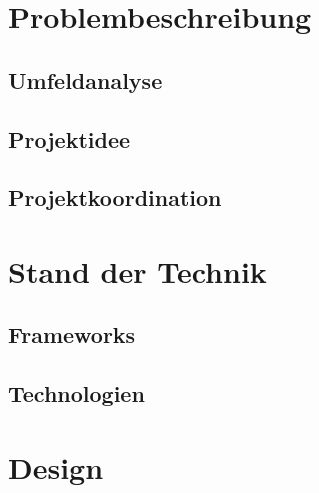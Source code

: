 \documentclass[12pt]{article}
\begin{document}
\section{Problembeschreibung}
\label{sec:problembeschreibung}


\subsection{Umfeldanalyse}
\label{subsec:umfeldanalyse}


\newpage

\subsection{Projektidee}
\label{subsec:projektidee}


\subsection{Projektkoordination}
\label{subsec:projektkoordination}


\newpage

\section{Stand der Technik}
\label{sec:standdertechnik}


\subsection{Frameworks}
\label{subsec:frameworks}


\newpage

\subsection{Technologien}
\label{subsec:technologien}


\newpage %

\section{Design}
\label{sec:design}

\end{document}
